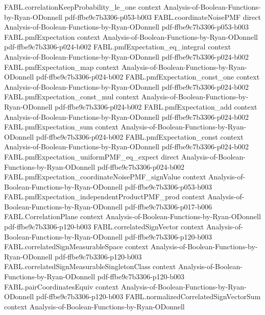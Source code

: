 \begin{theorem}
\proofstep
  {FABL.correlationKeepProbability_le_one}
  {context}
  {Analysis-of-Boolean-Functions-by-Ryan-ODonnell}
  {pdf-ffbe9c7b3306-p053-b003}
\proofstep
  {FABL.coordinateNoisePMF}
  {direct}
  {Analysis-of-Boolean-Functions-by-Ryan-ODonnell}
  {pdf-ffbe9c7b3306-p053-b003}
\proofstep
  {FABL.pmfExpectation}
  {context}
  {Analysis-of-Boolean-Functions-by-Ryan-ODonnell}
  {pdf-ffbe9c7b3306-p024-b002}
\proofstep
  {FABL.pmfExpectation_eq_integral}
  {context}
  {Analysis-of-Boolean-Functions-by-Ryan-ODonnell}
  {pdf-ffbe9c7b3306-p024-b002}
\proofstep
  {FABL.pmfExpectation_map}
  {context}
  {Analysis-of-Boolean-Functions-by-Ryan-ODonnell}
  {pdf-ffbe9c7b3306-p024-b002}
\proofstep
  {FABL.pmfExpectation_const_one}
  {context}
  {Analysis-of-Boolean-Functions-by-Ryan-ODonnell}
  {pdf-ffbe9c7b3306-p024-b002}
\proofstep
  {FABL.pmfExpectation_const_mul}
  {context}
  {Analysis-of-Boolean-Functions-by-Ryan-ODonnell}
  {pdf-ffbe9c7b3306-p024-b002}
\proofstep
  {FABL.pmfExpectation_add}
  {context}
  {Analysis-of-Boolean-Functions-by-Ryan-ODonnell}
  {pdf-ffbe9c7b3306-p024-b002}
\proofstep
  {FABL.pmfExpectation_sum}
  {context}
  {Analysis-of-Boolean-Functions-by-Ryan-ODonnell}
  {pdf-ffbe9c7b3306-p024-b002}
\proofstep
  {FABL.pmfExpectation_const}
  {context}
  {Analysis-of-Boolean-Functions-by-Ryan-ODonnell}
  {pdf-ffbe9c7b3306-p024-b002}
\proofstep
  {FABL.pmfExpectation_uniformPMF_eq_expect}
  {direct}
  {Analysis-of-Boolean-Functions-by-Ryan-ODonnell}
  {pdf-ffbe9c7b3306-p024-b002}
\proofstep
  {FABL.pmfExpectation_coordinateNoisePMF_signValue}
  {context}
  {Analysis-of-Boolean-Functions-by-Ryan-ODonnell}
  {pdf-ffbe9c7b3306-p053-b003}
\proofstep
  {FABL.pmfExpectation_independentProductPMF_prod}
  {context}
  {Analysis-of-Boolean-Functions-by-Ryan-ODonnell}
  {pdf-ffbe9c7b3306-p017-b006}
\proofstep
  {FABL.CorrelationPlane}
  {context}
  {Analysis-of-Boolean-Functions-by-Ryan-ODonnell}
  {pdf-ffbe9c7b3306-p120-b003}
\proofstep
  {FABL.correlatedSignVector}
  {context}
  {Analysis-of-Boolean-Functions-by-Ryan-ODonnell}
  {pdf-ffbe9c7b3306-p120-b003}
\proofstep
  {FABL.correlatedSignMeasurableSpace}
  {context}
  {Analysis-of-Boolean-Functions-by-Ryan-ODonnell}
  {pdf-ffbe9c7b3306-p120-b003}
\proofstep
  {FABL.correlatedSignMeasurableSingletonClass}
  {context}
  {Analysis-of-Boolean-Functions-by-Ryan-ODonnell}
  {pdf-ffbe9c7b3306-p120-b003}
\proofstep
  {FABL.pairCoordinatesEquiv}
  {context}
  {Analysis-of-Boolean-Functions-by-Ryan-ODonnell}
  {pdf-ffbe9c7b3306-p120-b003}
\proofstep
  {FABL.normalizedCorrelatedSignVectorSum}
  {context}
  {Analysis-of-Boolean-Functions-by-Ryan-ODonnell}

\end{theorem}
